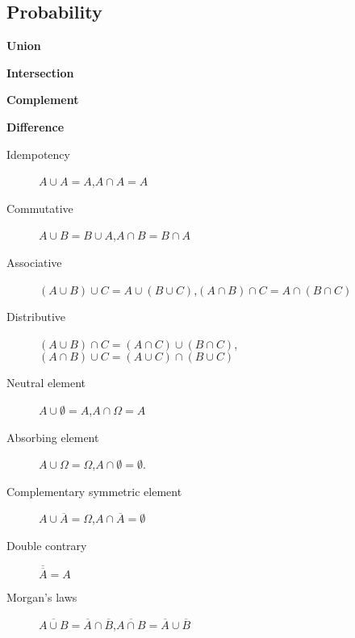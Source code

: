 \begin{multicols*}{2}
  \newpage 

	\subsection*{Probability}

	\begin{tcolorbox}[hbox, title=Event operations]
		\begin{minipage}{0.4\textwidth}
				\textbf{Union}
				      \begin{center}
					      
				      \end{center}
				\textbf{Intersection}
				      \begin{center}
					      
				      \end{center}
				\textbf{Complement}
				      \begin{center}
					      
				      \end{center}
				\textbf{Difference}
				      \begin{center}
					      
				      \end{center}
		\end{minipage}
  \end{tcolorbox}
  
  \begin{tcolorbox}[hbox, title=Algebra of events]
		\begin{minipage}{0.4\textwidth}
			\begin{description}
				\item[Idempotency] $A\cup A=A$,\quad $A\cap A=A$
        \item[Commutative] $A\cup B=B\cup A$,\quad $A\cap B = B\cap A$
        \item[Associative] $(A\cup B)\cup C = A\cup (B\cup C)$,\quad $(A\cap B)\cap C = A\cap (B\cap C)$
        \item[Distributive] $(A\cup B)\cap C = (A\cap C)\cup (B\cap C)$,\quad $(A\cap B)\cup C = (A\cup C)\cap (B\cup C)$
        \item[Neutral element] $A\cup \emptyset=A$,\quad $A\cap \Omega=A$
        \item[Absorbing element] $A\cup \Omega=\Omega$,\quad $A\cap \emptyset=\emptyset$.
        \item[Complementary symmetric element] $A\cup \overline A = \Omega$,\quad $A\cap \overline A= \emptyset$
        \item[Double contrary] $\overline{\overline A} = A$
        \item[Morgan's laws] $\overline{A\cup B} = \overline A\cap \overline B$,\quad $\overline{A\cap B} = \overline A\cup \overline B$
			\end{description}
		\end{minipage}
	\end{tcolorbox}


\end{multicols*}
